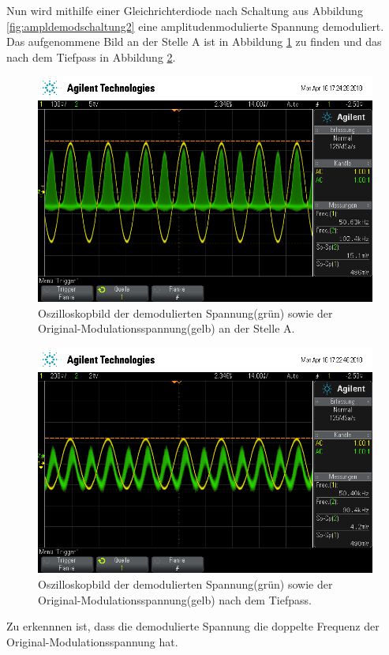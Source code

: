 Nun wird mithilfe einer Gleichrichterdiode nach Schaltung aus Abbildung \ref{fig:ampldemodschaltung2} eine amplitudenmodulierte Spannung demoduliert.
Das aufgenommene Bild an der Stelle A ist in Abbildung \ref{fig:gnachA} zu finden und das nach dem Tiefpass in Abbildung \ref{fig:gnachTiefpass}.
\begin{figure}[h]
  \centering
  \includegraphics[width=.9\textwidth]{Oszi_Pics/gnachA.png}
  \caption{Oszilloskopbild der demodulierten Spannung(grün) sowie der Original-Modulationsspannung(gelb) an der Stelle A.}
  \label{fig:gnachA}
\end{figure}
\begin{figure}[h]
  \centering
  \includegraphics[width=.9\textwidth]{Oszi_Pics/gnachTiefpass.png}
  \caption{Oszilloskopbild der demodulierten Spannung(grün) sowie der Original-Modulationsspannung(gelb) nach dem Tiefpass.}
  \label{fig:gnachTiefpass}
\end{figure}
Zu erkennnen ist, dass die demodulierte Spannung die doppelte Frequenz der Original-Modulationsspannung hat.

